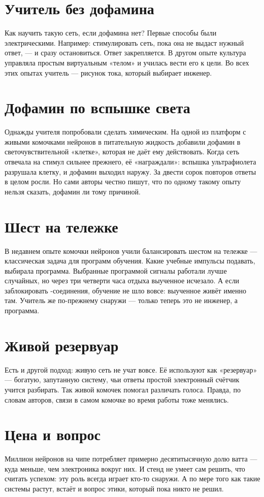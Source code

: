\section*{Учитель без дофамина}

Как научить такую сеть, если дофамина нет? Первые способы были электрическими. Например: стимулировать сеть, пока она не выдаст нужный ответ, --- и сразу остановиться. Ответ закрепляется. В другом опыте культура управляла простым виртуальным «телом» и училась вести его к цели. Во всех этих опытах учитель --- рисунок тока, который выбирает инженер.

\section*{Дофамин по вспышке света}

Однажды учителя попробовали сделать химическим. На одной из платформ с живыми комочками нейронов в питательную жидкость добавили дофамин в светочувствительной «клетке», которая не даёт ему действовать. Когда сеть отвечала на стимул сильнее прежнего, её «награждали»: вспышка ультрафиолета разрушала клетку, и дофамин выходил наружу. За двести сорок повторов ответы в целом росли. Но сами авторы честно пишут, что по одному такому опыту нельзя сказать, дофамин ли тому причиной.

\section*{Шест на тележке}

В недавнем опыте комочки нейронов учили балансировать шестом на тележке --- классическая задача для программ обучения. Какие учебные импульсы подавать, выбирала программа. Выбранные программой сигналы работали лучше случайных, но через три четверти часа отдыха выученное исчезало. А если заблокировать -соединения, обучение не шло вовсе: выученное живёт именно там. Учитель же по-прежнему снаружи --- только теперь это не инженер, а программа.

\section*{Живой резервуар}

Есть и другой подход: живую сеть не учат вовсе. Её используют как «резервуар» --- богатую, запутанную систему, чьи ответы простой электронный счётчик учится разбирать. Так живой комочек помогал различать голоса. Правда, по словам авторов, связи в самом комочке во время работы тоже менялись.

\section*{Цена и вопрос}

Миллион нейронов на чипе потребляет примерно десятитысячную долю ватта --- куда меньше, чем электроника вокруг них. И стенд не умеет сам решить, что считать успехом: эту роль всегда играет кто-то снаружи. А по мере того как такие системы растут, встаёт и вопрос этики, который пока никто не решил.

